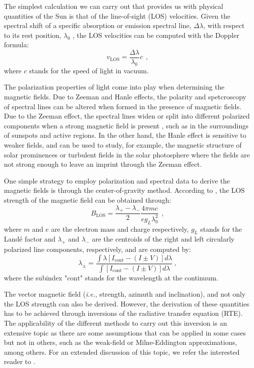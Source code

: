 The simplest calculation we can carry out that provides us with physical quantities of the Sun is that of the line-of-sight (LOS) velocities. Given the spectral shift of a specific absorption or emission spectral line, $\Delta \lambda$, with respect to its rest position, $\lambda _ 0$ , the LOS velocities can be computed with the Doppler formula: 
\begin{equation}
  v_{\text{LOS}} = \frac{\Delta \lambda}{\lambda _ 0}c\ \ ,
  \label{eq_spectro: Doppler}
\end{equation}
where $c$ stands for the speed of light in vacuum. 

The polarization properties of light come into play when determining the magnetic fields. Due to Zeeman and Hanle effects, the polarity and spetcroscopy of spectral lines can be altered when formed in the presence of magnetic fields. Due to the Zeeman effect, the spectral lines widen or split into different polarized components when a strong magnetic field is present \citep{libro_JoseCarlos}, such as in the surroundings of sunspots and active regions. In the other hand, the Hanle effect is sensitive to weaker fields, and can be used to study, for example, the magnetic structure of solar prominences or turbulent fields in the solar photosphere \citep{hanle} where the fields are not strong enough to leave an imprint through the Zeeman effect.  

One simple strategy to employ polarization and spectral data to derive the magnetic fields is through the center-of-gravity method. According to \cite{center_of_gravity}, the LOS strength of the magnetic field can be obtained through:
\begin{equation}
  B_{\text{LOS}} = \frac{\lambda _ {+} - \lambda _ -}{2}\frac{4\pi m c}{eg_{L}\lambda_0 ^2}\ \ ,
  \label{eq_spectro: Blos-cog}
\end{equation}  
where $m$ and $e$ are the electron mass and charge respectively, $g_L$ stands for the Landé factor and $\lambda _ {+}$ and $\lambda _ {-}$ are the centroids of the right and left circularly polarized line components, respectively, and are computed by:
\begin{equation}
  \lambda _ {\pm} = \frac{\int \lambda \left[I_{\text{cont}} - (I \pm V)\right]d\lambda}{\int \left[I_{\text{cont}} - (I \pm V)\right]d\lambda} \ ,
  \label{eq_spectro: lambda_plus_minus}
\end{equation} 
where the subindex "$\text{cont}$" stands for the wavelength at the continuum. 

The vector magnetic field (\textit{i.e.}, strength, azimuth and inclination), and not only the LOS strength can also be derived. However, the derivation of these quantities has to be achieved through inversions of the radiative transfer equation (RTE). The applicability of the different methods to carry out this inversion is an extensive topic as there are some assumptions that can be applied in some cases but not in others, such as the weak-field or Milne-Eddington approximations, among others. For an extended discussion of this topic, we refer the interested reader to \cite{del2016inversion}.   